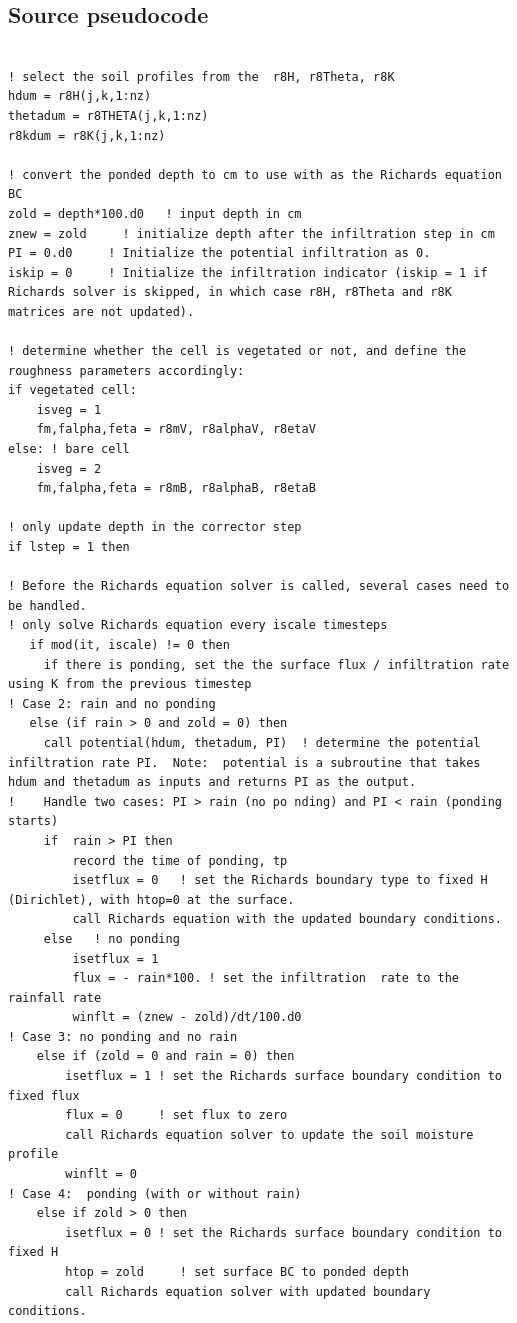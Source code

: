 \documentclass{article}
\begin{document}
\subsection{Source pseudocode }

\begin{lstlisting}

! select the soil profiles from the  r8H, r8Theta, r8K 
hdum = r8H(j,k,1:nz)
thetadum = r8THETA(j,k,1:nz)   
r8kdum = r8K(j,k,1:nz) 

! convert the ponded depth to cm to use with as the Richards equation BC
zold = depth*100.d0   ! input depth in cm
znew = zold     ! initialize depth after the infiltration step in cm
PI = 0.d0     ! Initialize the potential infiltration as 0.
iskip = 0     ! Initialize the infiltration indicator (iskip = 1 if Richards solver is skipped, in which case r8H, r8Theta and r8K  matrices are not updated). 

! determine whether the cell is vegetated or not, and define the roughness parameters accordingly:
if vegetated cell:
    isveg = 1
    fm,falpha,feta = r8mV, r8alphaV, r8etaV
else: ! bare cell
	isveg = 2
    fm,falpha,feta = r8mB, r8alphaB, r8etaB	

! only update depth in the corrector step
if lstep = 1 then

! Before the Richards equation solver is called, several cases need to be handled. 
! only solve Richards equation every iscale timesteps
   if mod(it, iscale) != 0 then 
     if there is ponding, set the the surface flux / infiltration rate using K from the previous timestep
! Case 2: rain and no ponding
   else (if rain > 0 and zold = 0) then
     call potential(hdum, thetadum, PI)  ! determine the potential infiltration rate PI.  Note:  potential is a subroutine that takes hdum and thetadum as inputs and returns PI as the output.
!    Handle two cases: PI > rain (no po	nding) and PI < rain (ponding starts)
     if  rain > PI then
         record the time of ponding, tp
	     isetflux = 0   ! set the Richards boundary type to fixed H (Dirichlet), with htop=0 at the surface.
	     call Richards equation with the updated boundary conditions.	   
     else 	! no ponding
     	 isetflux = 1
     	 flux = - rain*100. ! set the infiltration 	rate to the rainfall rate       
	     winflt = (znew - zold)/dt/100.d0 
! Case 3: no ponding and no rain
    else if (zold = 0 and rain = 0) then
	    isetflux = 1 ! set the Richards surface boundary condition to fixed flux
		flux = 0     ! set flux to zero
		call Richards equation solver to update the soil moisture profile
		winflt = 0
! Case 4:  ponding (with or without rain)
	else if zold > 0 then
	    isetflux = 0 ! set the Richards surface boundary condition to fixed H
		htop = zold     ! set surface BC to ponded depth
		call Richards equation solver with updated boundary conditions.
	    

\end{lstlisting}
\end{document}
